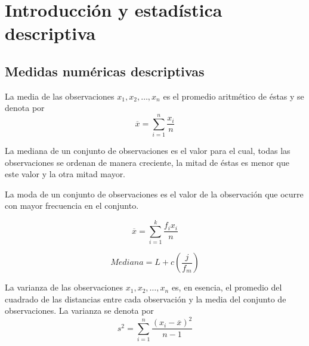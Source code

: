 \chapter{Introducción y estadística descriptiva}

\setcounter{section}{2}
\section{Medidas numéricas descriptivas}

\begin{def.} La media de las observaciones $x_1,x_2,\ldots , x_n$ es el promedio aritmético de éstas y se denota por 
    \begin{equation}
	\overline{x} = \sum_{i=1}^{n} \dfrac{x_i}{n}
    \end{equation}
\end{def.}

\begin{def.} La mediana de un conjunto de observaciones es el valor para el cual, todas las observaciones se ordenan de manera creciente, la mitad de éstas es menor que este valor y la otra mitad mayor.
\end{def.}

\begin{def.} La moda de un conjunto de observaciones es el valor de la observación que ocurre con mayor frecuencia en el conjunto.
\end{def.}

    \begin{equation}
	\overline{x} = \sum_{i=1}^{k} \dfrac{f_i x_i}{n}
    \end{equation}

    \begin{equation}
	Mediana = L + c\left( \dfrac{j}{f_m}\right)
    \end{equation}

\begin{def.} La varianza de las observaciones $x_1,x_2,\ldots , x_n$ es, en esencia, el promedio del cuadrado de las distancias entre cada observación y la media del conjunto de observaciones. La varianza se denota por 
    \begin{equation}
	s^2 = \sum_{i=1}^{n} \dfrac{(x_i - \overline{x})^2}{n-1}
    \end{equation}
\end{def.}

